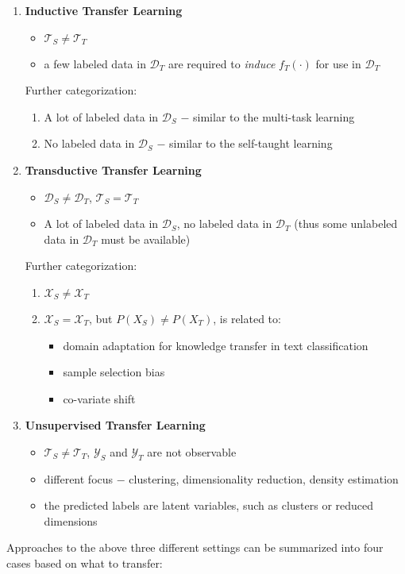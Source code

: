\documentclass[a4paper,twocolumn]{article}
\newcommand{\D}{\mathcal{D}}
\newcommand{\T}{\mathcal{T}}
\newcommand{\X}{\mathcal{X}}
\newcommand{\Y}{\mathcal{Y}}
\begin{document}
\begin{enumerate}
    \item \textbf{Inductive Transfer Learning}
        \begin{itemize}
            \item $\T_S \ne \T_T$
            \item a few labeled data in $\D_T$ are required to \textit{induce} $f_T(\cdot)$ for use in $\D_T$
        \end{itemize}
        Further categorization:
        \begin{enumerate}
            \item A lot of labeled data in $\D_S$ $-$ similar to the multi-task learning
            \item No labeled data in $\D_S$ $-$ similar to the self-taught learning
        \end{enumerate}
    \item \textbf{Transductive Transfer Learning}
        \begin{itemize}
            \item $\D_S \ne \D_T$, $\T_S = \T_T$
            \item A lot of labeled data in $\D_S$, no labeled data in $\D_T$ (thus some unlabeled data in $\D_T$ must be available)
        \end{itemize}
        Further categorization:
        \begin{enumerate}
            \item $\X_S \ne \X_T$
            \item $\X_S = \X_T$, but $P(X_S) \ne P(X_T)$, is related to:
                \begin{itemize}
                    \item domain adaptation for knowledge transfer in text classification
                    \item sample selection bias
                    \item co-variate shift
                \end{itemize}
        \end{enumerate}
    \item \textbf{Unsupervised Transfer Learning}
        \begin{itemize}
            \item $\T_S \ne \T_T$, $\Y_S$ and $\Y_T$ are not observable
            \item different focus $-$ clustering, dimensionality reduction, density estimation
            \item the predicted labels are latent variables, such as clusters or reduced dimensions
        \end{itemize}
\end{enumerate}
Approaches to the above three different settings can be summarized into four cases based on what to transfer:
\end{document}
